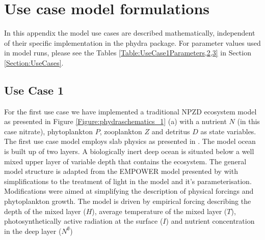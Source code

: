 \documentclass[journal abbreviations, manuscript]{copernicus}
\begin{document}
\clearpage
\appendix


\section{Use case model formulations}

In this appendix the model use cases are described mathematically, independent of their specific implementation in the phydra package. For parameter values used in model runs, please see the Tables \ref{Table:UseCase1Parameters,2,3} in Section \ref{Section:UseCases}.

\subsection{Use Case 1}

For the first use case we have implemented a traditional NPZD ecosystem model as presented in Figure \ref{Figure:phydraschematics_1} (a) with a nutrient $N$ (in this case nitrate), phytoplankton $P$, zooplankton $Z$ and detritus $D$ as state variables. The first use case model employs slab physics as presented in \citet{Evans1985ACycles}. The model ocean is built up of two layers. A biologically inert deep ocean is situated below a well mixed upper layer of variable depth that contains the ecosystem. The general model structure is adapted from the EMPOWER model presented by \citet{Anderson2015c} with simplifications to the treatment of light in the model and it's parameterisation. 
Modifications were aimed at simplifying the description of physical forcings and phytoplankton growth. The model is driven by empirical forcing describing the depth of the mixed layer ($H$), average temperature of the mixed layer ($T$), photosynthetically active radiation at the surface ($I$) and nutrient concentration in the deep layer ($N^\emptyset$) 
\end{document}
